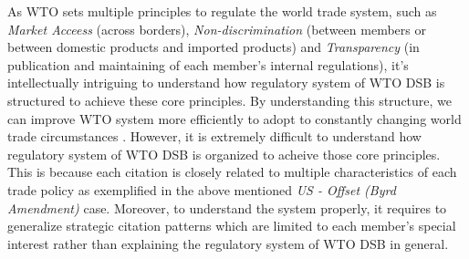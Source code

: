 As WTO sets multiple principles to regulate the world trade system, 
such as \textit{Market Acceess} (across borders), 
\textit{Non-discrimination} (between members 
or between domestic products and imported products) 
and \textit{Transparency} (in publication and maintaining 
of each member's internal regulations), 
it's intellectually intriguing 
to understand how regulatory system of WTO DSB
is structured to achieve these core principles.
By understanding this structure, 
we can improve WTO system more efficiently 
to adopt to constantly 
changing world trade circumstances
\citep{FREDEBEULKREIN1999625, shaffer_2004, 10.1093/jiel/jgm028}.
However, it is extremely difficult to 
understand how regulatory system of 
WTO DSB is organized to acheive 
those core principles. 
This is because each citation is closely related 
to multiple characteristics 
of each trade policy as exemplified in 
the above mentioned \textit{US - Offset (Byrd Amendment)} case. 
Moreover, to understand the system properly, 
it requires to generalize strategic 
citation patterns which are limited 
to each member's special interest 
rather than explaining the 
regulatory system of WTO DSB in general.


